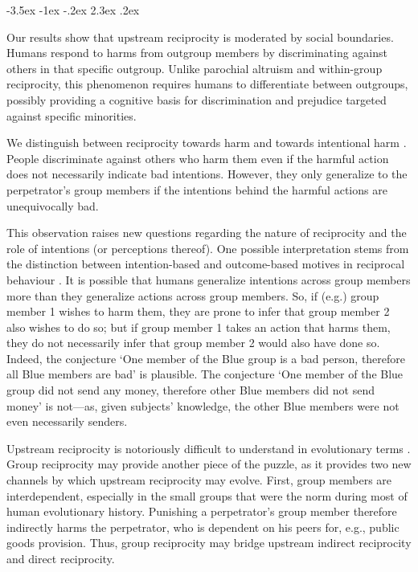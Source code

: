 \documentclass[12pt,a4paper]{article}
\makeatletter
\renewcommand\section{\@startsection {section}{1}{\z@}%
{-3.5ex \@plus -1ex \@minus -.2ex}%
{2.3ex \@plus.2ex}%
{\bf\sffamily\Large}}
\providecommand{\DIFaddtex}[1]{{\protect\color{blue}\uwave{#1}}} %
\providecommand{\DIFaddbegin}{} %
\providecommand{\DIFaddend}{} %
\providecommand{\DIFadd}[1]{\texorpdfstring{\DIFaddtex{#1}}{#1}} %
\makeatother
\begin{document}
\DIFaddbegin \section{\DIFadd{Discussion}}
\label{sec:conclusion}
\DIFaddend 

Our results show that upstream reciprocity is moderated by social boundaries. 
Humans respond to harms from outgroup members by discriminating against others 
in that specific outgroup. Unlike parochial altruism and within-group reciprocity, 
this phenomenon requires humans to differentiate between outgroups, possibly 
providing a cognitive basis for discrimination and prejudice targeted against specific minorities. 

We distinguish between reciprocity towards harm and towards intentional harm
\citep{stanca2009testing}. People discriminate against others who harm them even
if the harmful action does not necessarily indicate bad intentions. However,
they only generalize to the perpetrator's  group members if the intentions
behind the harmful actions are unequivocally bad.

This observation raises new questions regarding the nature of reciprocity
and the role of intentions (or perceptions thereof). One possible
interpretation stems from the distinction between intention-based
and outcome-based motives in reciprocal behaviour \citep{falk2006theory}. It is
possible that humans generalize intentions across group members more than they generalize
actions across group members. So, if (e.g.)  group member 1 wishes to harm them,  they are prone to infer
that group member 2 also wishes to do so; but if group member 1 takes an action
that harms them, they do not necessarily infer that group member 2 would also
have done so. Indeed, the conjecture `One member of the Blue
group is a bad person, therefore all Blue members are bad' is plausible.
The conjecture `One member of the Blue group did not send any money,
therefore other Blue members did not send money' is not---as, given subjects' knowledge, the other
Blue members were not even necessarily senders.

Upstream reciprocity is notoriously difficult to understand in evolutionary
terms \citep{boyd1989evolution,nowak2007upstream}. Group reciprocity
may provide another piece of the puzzle, as it provides two new channels
by which upstream reciprocity may evolve. First, group members are
interdependent, especially in the small groups that were the norm
during most of human evolutionary history. Punishing a perpetrator's
group member therefore indirectly harms the perpetrator, who is dependent
on his peers for, e.g., public goods provision. Thus, group reciprocity
may bridge upstream indirect reciprocity and direct reciprocity.
\end{document}
